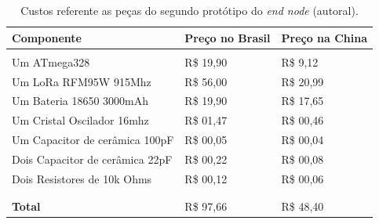 \begin{table}[H]
  \centering 
  \scalebox{1} {
    \begin{tabular}{l | l | l}
    \textbf{Componente}&\textbf{Preço no Brasil}&\textbf{Preço na China}\\[5pt] \hline
    &&\\
    Um ATmega328&R\$ 19,90&R\$ 9,12 \\[5pt]
    Um LoRa RFM95W 915Mhz&R\$ 56,00&R\$ 20,99 \\[5pt]
    Um Bateria 18650 3000mAh&R\$ 19,90 &R\$ 17,65 \\[5pt]
    Um Cristal Oscilador 16mhz&R\$ 01,47&R\$ 00,46 \\[5pt]
    Um Capacitor de cerâmica 100pF&R\$ 00,05&R\$ 00,04 \\[5pt]
    Dois Capacitor de cerâmica 22pF&R\$ 00,22&R\$ 00,08 \\[5pt]
    Dois Resistores de 10k Ohms&R\$ 00,12&R\$ 00,06 \\
    &&\\ \hline
    &&\\
    \textbf{Total}&R\$ 97,66&R\$ 48,40 \\[5pt]
    \end{tabular}
  }
  \caption{Custos referente as peças do segundo protótipo do \textit{end node} (autoral).}
  \label{tab:costs-2-proto}
\end{table}
  